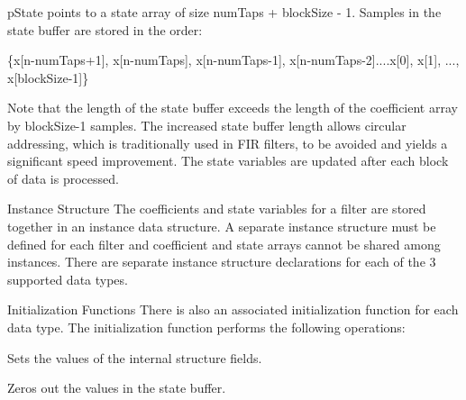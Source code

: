 \begin{DoxyParagraph}{}
{\ttfamily p\-State} points to a state array of size {\ttfamily num\-Taps + block\-Size -\/ 1}. Samples in the state buffer are stored in the order\-: 
\end{DoxyParagraph}
\begin{DoxyParagraph}{}

\begin{DoxyPre}    
    \{x[n-numTaps+1], x[n-numTaps], x[n-numTaps-1], x[n-numTaps-2]....x[0], x[1], ..., x[blockSize-1]\}    
 \end{DoxyPre}
 
\end{DoxyParagraph}
\begin{DoxyParagraph}{}
Note that the length of the state buffer exceeds the length of the coefficient array by {\ttfamily block\-Size-\/1} samples. The increased state buffer length allows circular addressing, which is traditionally used in F\-I\-R filters, to be avoided and yields a significant speed improvement. The state variables are updated after each block of data is processed. 
\end{DoxyParagraph}
\begin{DoxyParagraph}{Instance Structure }
The coefficients and state variables for a filter are stored together in an instance data structure. A separate instance structure must be defined for each filter and coefficient and state arrays cannot be shared among instances. There are separate instance structure declarations for each of the 3 supported data types.
\end{DoxyParagraph}
\begin{DoxyParagraph}{Initialization Functions }
There is also an associated initialization function for each data type. The initialization function performs the following operations\-:
\begin{DoxyItemize}
\item Sets the values of the internal structure fields.
\item Zeros out the values in the state buffer. 
\end{DoxyItemize}
\end{DoxyParagraph}
